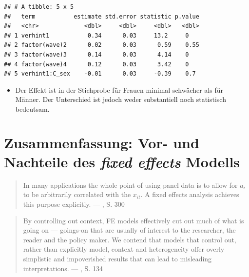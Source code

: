 \documentclass[
]{book}
\providecommand{\tightlist}{%
  \setlength{\itemsep}{0pt}\setlength{\parskip}{0pt}}
\begin{document}
\begin{verbatim}
## # A tibble: 5 x 5
##   term           estimate std.error statistic p.value
##   <chr>             <dbl>     <dbl>     <dbl>   <dbl>
## 1 verhint1           0.34      0.03     13.2     0   
## 2 factor(wave)2      0.02      0.03      0.59    0.55
## 3 factor(wave)3      0.14      0.03      4.14    0   
## 4 factor(wave)4      0.12      0.03      3.42    0   
## 5 verhint1:C_sex    -0.01      0.03     -0.39    0.7
\end{verbatim}

\begin{itemize}
\tightlist
\item
  Der Effekt ist in der Stichprobe für Frauen minimal schwächer als für Männer. Der Unterschied ist jedoch weder substantiell noch statistisch bedeutsam.
\end{itemize}

\hypertarget{zusammenfassung-vor--und-nachteile-des-fixed-effects-modells}{%
\section{\texorpdfstring{Zusammenfassung: Vor- und Nachteile des \emph{fixed effects} Modells}{Zusammenfassung: Vor- und Nachteile des fixed effects Modells}}\label{zusammenfassung-vor--und-nachteile-des-fixed-effects-modells}}

\begin{quote}
In many applications the whole point of using panel data is to allow for \(a_i\) to be arbitrarily correlated with the \(x_{it}\). A fixed effects analysis achieves this purpose explicitly. --- \citet{wooldridge10}, S. 300
\end{quote}

\begin{quote}
By controlling out context, FE models effectively cut out much of what is going on --- goings-on that are usually of interest to the researcher, the reader and the policy maker. We contend that models that control out, rather than explicitly model, context and heterogeneity offer overly simplistic and impoverished results that can lead to misleading interpretations. --- \citet{bellExplainingFixedEffects2015}, S. 134
\end{quote}
\end{document}

